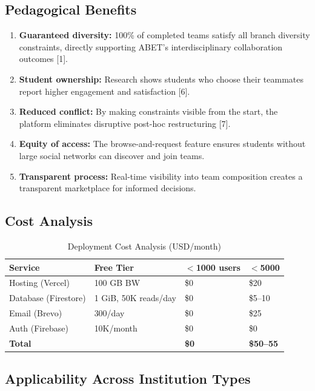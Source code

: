 \documentclass[12pt,a4paper]{article}
\begin{document}
\subsection{Pedagogical Benefits}

\begin{enumerate}[noitemsep,topsep=3pt]
    \item \textbf{Guaranteed diversity:} 100\% of completed teams satisfy all branch diversity constraints, directly supporting ABET's interdisciplinary collaboration outcomes [1].
    \item \textbf{Student ownership:} Research shows students who choose their teammates report higher engagement and satisfaction [6].
    \item \textbf{Reduced conflict:} By making constraints visible from the start, the platform eliminates disruptive post-hoc restructuring [7].
    \item \textbf{Equity of access:} The browse-and-request feature ensures students without large social networks can discover and join teams.
    \item \textbf{Transparent process:} Real-time visibility into team composition creates a transparent marketplace for informed decisions.
\end{enumerate}

\subsection{Cost Analysis}

\begin{table}[H]
\centering
\caption{Deployment Cost Analysis (USD/month)}
\begin{tabular}{@{}llll@{}}
\toprule
\textbf{Service} & \textbf{Free Tier} & \textbf{$<$1000 users} & \textbf{$<$5000} \\
\midrule
Hosting (Vercel) & 100 GB BW & \$0 & \$20 \\
Database (Firestore) & 1 GiB, 50K reads/day & \$0 & \$5--10 \\
Email (Brevo) & 300/day & \$0 & \$25 \\
Auth (Firebase) & 10K/month & \$0 & \$0 \\
\midrule
\textbf{Total} & & \textbf{\$0} & \textbf{\$50--55} \\
\bottomrule
\end{tabular}
\end{table}

\subsection{Applicability Across Institution Types}
\end{document}
